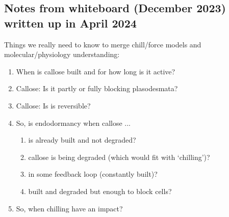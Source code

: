 \documentclass[11pt,letter]{article}
\begin{document}
\newpage
\subsection{Notes from whiteboard (December 2023) written up in April 2024}

Things we really need to know to merge chill/force models and molecular/physiology understanding:
\begin{enumerate}
\item  When is callose built and for how long is it active?
\item  Callose: Is it partly or fully blocking plasodesmata?
\item Callose: Is is reversible?
\item So, is endodormancy when callose ...
\begin{enumerate}
\item  is already built and not degraded?
\item  callose is being degraded (which would fit with `chilling')?
\item  in some feedback loop (constantly built)?
\item  built and degraded but enough to block cells?
\end{enumerate}
\item So, when chilling have an impact?
\end{enumerate}
\end{document}
